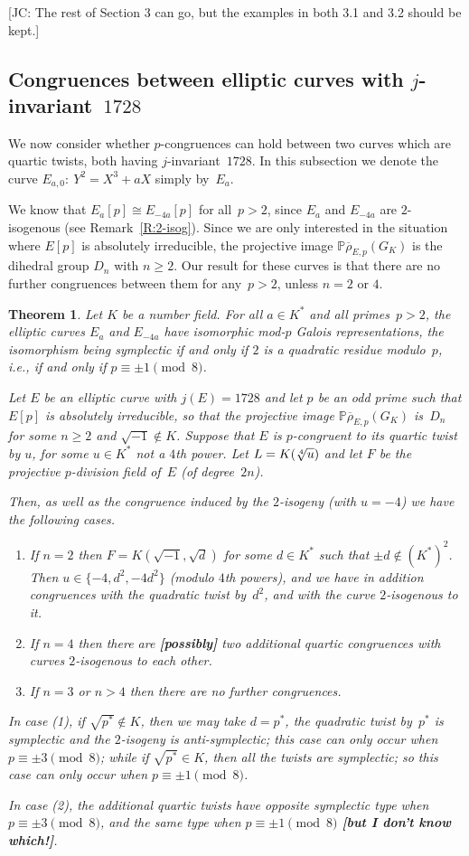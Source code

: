 \documentclass[12pt, reqno]{amsart}
\newcommand{\PP}{\mathbb{P}}
\newcommand{\rhobar}{{\overline{\rho}}}
\numberwithin{equation}{section}
\newtheorem{theorem}{Theorem}[section]
\theoremstyle{definition}
\theoremstyle{remark}
\newcommand{\jc}[1]{{\color{darkgreen} \textsf{[JC: #1]}}}
\begin{document}
\jc{The rest of Section 3 can go, but the examples in both 3.1 and 3.2
  should be kept.}
\subsection{Congruences between elliptic curves with
  $j$-invariant~$1728$}

We now consider whether $p$-congruences can hold between two curves
which are quartic twists, both having $j$-invariant~$1728$.  In this
subsection we denote the curve $E_{a,0}:\ Y^2=X^3+aX$ simply by~$E_a$.

We know that $E_a[p]\cong E_{-4a}[p]$ for all~$p>2$, since $E_a$ and
$E_{-4a}$ are $2$-isogenous (see Remark~\ref{R:2-isog}).  Since we are
only interested in the situation where $E[p]$ is absolutely
irreducible, the projective image $\PP\rhobar_{E,p}(G_K)$ is the
dihedral group $D_n$ with $n\ge2$.  Our result for these curves is
that there are no further congruences between them for any~$p>2$,
unless $n=2$ or $4$.

\begin{theorem}\label{T:j=1728}
Let $K$ be a number field.  For all $a \in K^*$ and all primes~$p>2$,
the elliptic curves $E_a$ and $E_{-4a}$ have isomorphic mod-$p$ Galois
representations, the isomorphism being symplectic if and only if $2$
is a quadratic residue modulo~$p$, \textit{i.e.}, if and only if
$p\equiv\pm1\pmod8$.

Let $E$ be an elliptic curve with $j(E)=1728$ and let $p$ be an odd
prime such that $E[p]$ is absolutely irreducible, so that the
projective image $\PP\rhobar_{E,p}(G_K)$ is~$D_n$ for some $n\ge2$ and
$\sqrt{-1}\not\in K$.  Suppose that $E$ is $p$-congruent to its
quartic twist by $u$, for some $u\in K^*$ not a $4$th power.  Let
$L=K(\root4\of{u})$ and let $F$ be the projective $p$-division field
of~$E$ (of degree~$2n$).

Then, as well as the congruence induced by the $2$-isogeny (with
$u=-4$) we have the following cases.
\begin{enumerate}
  \item If $n=2$ then $F=K(\sqrt{-1},\sqrt{d})$ for some $d\in K^*$
    such that $\pm d\not\in(K^*)^2$.  Then $u\in\{-4,d^2,-4d^2\}$
    (modulo $4$th powers), and we have in addition congruences with
    the quadratic twist by~$d^2$, and with the curve $2$-isogenous to
    it.
  \item If $n=4$ then there are \textbf{[possibly]} two additional
    quartic congruences with curves $2$-isogenous to each other.
  \item If $n=3$ or $n>4$ then there are no further congruences.
\end{enumerate}
In case (1), if $\sqrt{p^*}\not\in K$, then we may take $d=p^*$, the
quadratic twist by~$p^*$ is symplectic and the $2$-isogeny is
anti-symplectic; this case can only occur when $p\equiv\pm3\pmod8$;
while if $\sqrt{p^*}\in K$, then all the twists are symplectic; so this
case can only occur when $p\equiv\pm1\pmod8$.

In case (2), the additional quartic twists have opposite symplectic
type when $p\equiv\pm3\pmod8$, and the same type when
$p\equiv\pm1\pmod8$ \textbf{[but I don't know which!]}.
\end{theorem}
\end{document}
